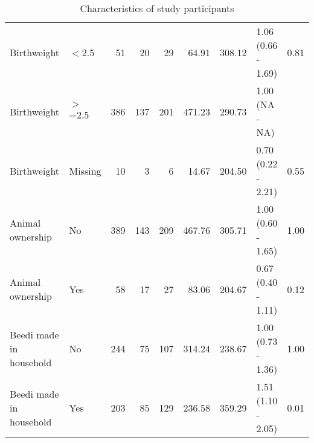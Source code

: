 \documentclass[11pt,a4paper,twoside]{article}\usepackage{graphicx, color}
\begin{document}
\begin{sidewaystable}[ht]
\begin{tabular}{llrrrrrlr}
  Birthweight & $<$2.5 & 51 & 20 & 29 & 64.91 & 308.12 & 1.06 (0.66 - 1.69) & 0.81 \\ 
  Birthweight & $>$=2.5 & 386 & 137 & 201 & 471.23 & 290.73 & 1.00 (NA - NA) &  \\ 
  Birthweight & Missing & 10 & 3 & 6 & 14.67 & 204.50 & 0.70 (0.22 - 2.21) & 0.55 \\ 
  Animal ownership & No & 389 & 143 & 209 & 467.76 & 305.71 & 1.00 (0.60 - 1.65) & 1.00 \\ 
  Animal ownership & Yes & 58 & 17 & 27 & 83.06 & 204.67 & 0.67 (0.40 - 1.11) & 0.12 \\ 
  Beedi made in household & No & 244 & 75 & 107 & 314.24 & 238.67 & 1.00 (0.73 - 1.36) & 1.00 \\ 
  Beedi made in household & Yes & 203 & 85 & 129 & 236.58 & 359.29 & 1.51 (1.10 - 2.05) & 0.01 \\ 
   \bottomrule
\end{tabular}
\caption{Characteristics of study participants} 
\label{epic}
\end{sidewaystable}
\end{document}
